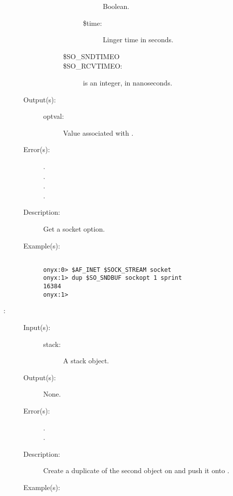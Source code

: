 \begin{description}
\begin{description}
\begin{description}
\begin{description}
\begin{description}
					Boolean.
				\item[\$time: ]
					Linger time in seconds.
				\end{description}
			\item[\$SO\_SNDTIMEO]
			\item[\$SO\_RCVTIMEO: ]
				 is an integer, in nanoseconds.
			\end{description}
		\end{description}
	\item[Output(s): ]
		\begin{description}\item[]
		\item[optval: ]
			Value associated with .
		\end{description}
	\item[Error(s): ]
		\begin{description}\item[]
		\item[.]
		\item[.]
		\item[.]
		\item[.]
		\end{description}
	\item[Description: ]
		Get a socket option.
	\item[Example(s): ]\begin{verbatim}

onyx:0> $AF_INET $SOCK_STREAM socket
onyx:1> dup $SO_SNDBUF sockopt 1 sprint
16384
onyx:1>
		\end{verbatim}
	\end{description}
\label{systemdict:sover}
\item[{\onyxop{stack}{sover}{--}}: ]
	\begin{description}\item[]
	\item[Input(s): ]
		\begin{description}\item[]
		\item[stack: ]
			A stack object.
		\end{description}
	\item[Output(s): ] None.
	\item[Error(s): ]
		\begin{description}\item[]
		\item[.]
		\item[.]
		\end{description}
	\item[Description: ]
		Create a duplicate of the second object on  and
		push it onto .
	\item[Example(s): ]\begin{verbatim}


\end{verbatim}
\end{description}
\end{description}
